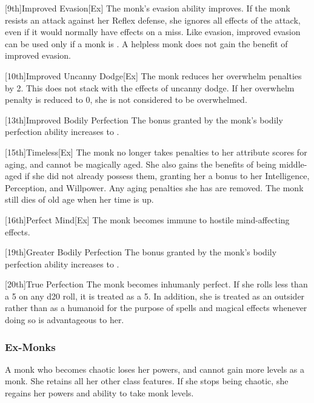 [9th]{Improved Evasion}[Ex]
The monk's evasion ability improves.
If the monk resists an attack against her Reflex defense, she ignores all effects of the attack, even if it would normally have effects on a miss.
Like evasion, improved evasion can be used only if a monk is \unencumbered.
A helpless monk does not gain the benefit of improved evasion.

[10th]{Improved Uncanny Dodge}[Ex]
The monk reduces her overwhelm penalties by 2.
This does not stack with the effects of uncanny dodge.
If her overwhelm penalty is reduced to 0, she is not considered to be overwhelmed.

[13th]{Improved Bodily Perfection}
The bonus granted by the monk's bodily perfection ability increases to .

[15th]{Timeless}[Ex]
The monk no longer takes penalties to her attribute scores for aging, and cannot be magically aged.
She also gains the benefits of being middle-aged if she did not already possess them, granting her a  bonus to her Intelligence, Perception, and Willpower.
Any aging penalties she has are removed.
The monk still dies of old age when her time is up.

[16th]{Perfect Mind}[Ex]
The monk becomes immune to hostile mind-affecting effects.

[19th]{Greater Bodily Perfection}
The bonus granted by the monk's bodily perfection ability increases to .

[20th]{True Perfection}
The monk becomes inhumanly perfect.
If she rolls less than a 5 on any d20 roll, it is treated as a 5.
In addition, she is treated as an outsider rather than as a humanoid for the purpose of spells and magical effects whenever doing so is advantageous to her.

\subsubsection{Ex-Monks}
A monk who becomes chaotic loses her \ki powers, and cannot gain more levels as a monk.
She retains all her other class features.
If she stops being chaotic, she regains her \ki powers and ability to take monk levels.

